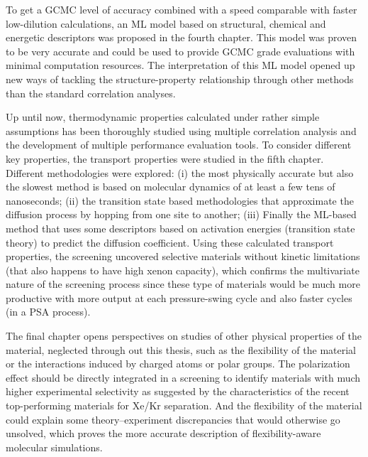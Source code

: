 To get a GCMC level of accuracy combined with a speed comparable with faster low-dilution calculations, an ML model based on structural, chemical and energetic descriptors was proposed in the fourth chapter.\autocite{Ren_2023_ml} This model was proven to be very accurate and could be used to provide GCMC grade evaluations with minimal computation resources. The interpretation of this ML model opened up new ways of tackling the structure-property relationship through other methods than the standard correlation analyses. 

Up until now, thermodynamic properties calculated under rather simple assumptions has been thoroughly studied using multiple correlation analysis and the development of multiple performance evaluation tools. To consider different key properties, the transport properties were studied in the fifth chapter. Different methodologies were explored: (i) the most physically accurate but also the slowest method is based on molecular dynamics of at least a few tens of nanoseconds; (ii) the transition state based methodologies that approximate the diffusion process by hopping from one site to another; (iii) Finally the ML-based method that uses some descriptors based on activation energies (transition state theory) to predict the diffusion coefficient. Using these calculated transport properties, the screening uncovered selective materials without kinetic limitations (that also happens to have high xenon capacity), which confirms the multivariate nature of the screening process since these type of materials would be much more productive with more output at each pressure-swing cycle and also faster cycles (in a PSA process). 

The final chapter opens perspectives on studies of other physical properties of the material, neglected through out this thesis, such as the flexibility of the material or the interactions induced by charged atoms or polar groups. The polarization effect should be directly integrated in a screening to identify materials with much higher experimental selectivity as suggested by the characteristics of the recent top-performing materials for Xe/Kr separation.\autocite{Li_2019,Pei_2022} And the flexibility of the material could explain some theory--experiment discrepancies that would otherwise go unsolved, which proves the more accurate description of flexibility-aware molecular simulations.

 
\begin{center}
\end{center}


